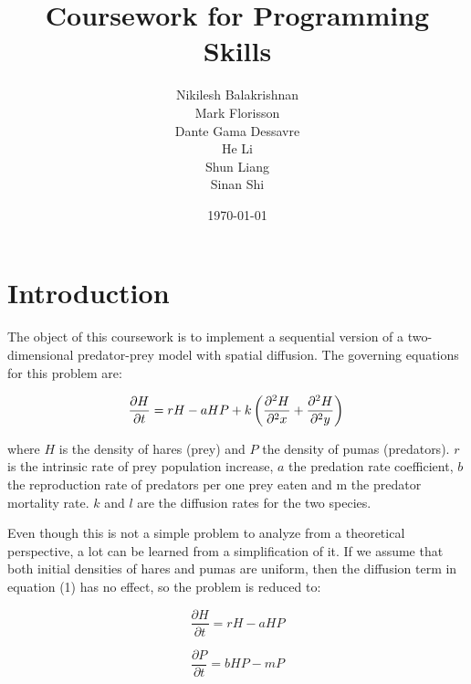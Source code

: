 \documentclass[12pt,a4paper]{article}
\begin{document}
\title{Coursework for Programming Skills}
\author{Nikilesh Balakrishnan\\
        Mark Florisson\\
        Dante Gama Dessavre\\
        He Li\\
        Shun Liang\\
        Sinan Shi}
\date{\today}

\makeEPCCtitle

\thispagestyle{empty}

\newpage


\tableofcontents

\newpage


\section{Introduction}

The object of this coursework is to implement a sequential version of a two-dimensional predator-prey model with spatial diffusion. The governing equations for this problem are:

\begin{equation}
\frac{\partial H}{\partial t}=rH-aHP+k\left(\frac{\partial^2 H}{\partial^2 x}+\frac{\partial^2 H}{\partial^2 y}\right)\\
\end{equation}

where $H$ is the density of hares (prey) and $P$ the density of pumas (predators). $r$ is the intrinsic rate of prey population increase, $a$ the predation rate coefficient, $b$ the reproduction rate of predators per one prey eaten and m the predator mortality rate. $k$ and $l$ are the diffusion rates for the two species.

Even though this is not a simple problem to analyze from a theoretical perspective, a lot can be learned from a simplification of it. If we assume that both initial densities of hares and pumas are uniform, then the diffusion term in equation (1) has no effect, so the problem is reduced to:

\begin{equation}
\frac{\partial H}{\partial t}=rH-aHP
\end{equation}

\begin{equation}
\frac{\partial P}{\partial t}=bHP-mP
\end{equation}
\end{document}
